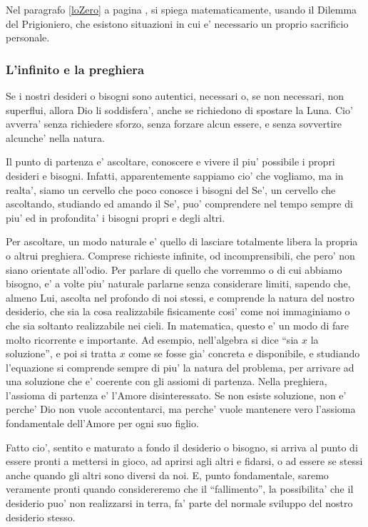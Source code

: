Nel paragrafo \ref{loZero} a pagina \pageref{loZero}, si spiega matematicamente, usando il Dilemma del Prigioniero, che esistono situazioni in cui e' necessario un proprio sacrificio personale.

\subsubsection{L'infinito e la preghiera}

Se i nostri desideri o bisogni sono autentici, necessari o, se non necessari, non superflui, allora Dio li soddisfera', anche se richiedono di spostare la Luna. Cio' avverra' senza richiedere sforzo, senza forzare alcun essere, e senza sovvertire alcunche' nella natura.

Il punto di partenza e' ascoltare, conoscere e vivere il piu' possibile i propri desideri e bisogni. Infatti, apparentemente sappiamo cio' che vogliamo, ma in realta', siamo un cervello che poco conosce i bisogni del Se', un cervello che ascoltando, studiando ed amando il Se', puo' comprendere nel tempo sempre di piu' ed in profondita' i bisogni propri e degli altri.

Per ascoltare, un modo naturale e' quello di lasciare totalmente libera la propria o altrui preghiera. Comprese richieste infinite, od incomprensibili, che pero' non siano orientate all'odio. Per parlare di quello che vorremmo o di cui abbiamo bisogno, e' a volte piu' naturale parlarne senza considerare limiti, sapendo che, almeno Lui, ascolta nel profondo di noi stessi, e comprende la natura del nostro desiderio, che sia la cosa realizzabile fisicamente cosi' come noi immaginiamo o che sia soltanto realizzabile nei cieli. In matematica, questo e' un modo di fare molto ricorrente e importante. Ad esempio, nell'algebra si dice ``sia $x$ la soluzione'', e poi si tratta $x$ come se fosse gia' concreta e disponibile, e studiando l'equazione si comprende sempre di piu' la natura del problema, per arrivare ad una soluzione che e' coerente con gli assiomi di partenza. Nella preghiera, l'assioma di partenza e' l'Amore disinteressato. Se non esiste soluzione, non e' perche' Dio non vuole accontentarci, ma perche' vuole mantenere vero l'assioma fondamentale dell'Amore per ogni suo figlio. 

Fatto cio', sentito e maturato a fondo il desiderio o bisogno, si arriva al punto di essere pronti a mettersi in gioco, ad aprirsi agli altri e fidarsi, o ad essere se stessi anche quando gli altri sono diversi da noi. E, punto fondamentale, saremo veramente pronti quando considereremo che il ``fallimento'', la possibilita' che il desiderio puo' non realizzarsi in terra, fa' parte del normale sviluppo del nostro desiderio stesso. 

